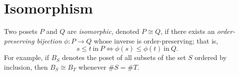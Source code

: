 \section{Isomorphism}

Two posets $P$ and $Q$ are \emph{isomorphic}, denoted $P \cong Q$, if there exists an \emph{order-preserving bijection} $\phi : P \to Q$ whose inverse is order-preserving; that is, $$s \leq t~\text{in}~P \iff \phi(s) \leq \phi(t)~\text{in}~Q.$$ For example, if $B_S$ denotes the poset of all subsets of the set $S$ ordered by inclusion, then $B_S \cong B_T$ whenever $\#S = \#T$. \cite{Stanley:2011:ECV:2124415}